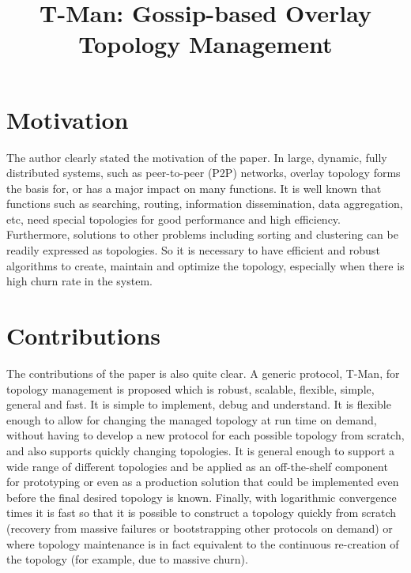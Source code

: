 \documentclass[conference]{IEEEtran}
\begin{document}
\title{T-Man: Gossip-based Overlay Topology Management}


\author{
\and
{}
}
\maketitle
\IEEEpeerreviewmaketitle



\section{Motivation}

The author clearly stated the motivation of the paper. In large, dynamic, fully distributed systems, such as peer-to-peer (P2P) networks, overlay topology forms the basis for, or has a major impact on many functions. It is well known that functions such as searching, routing, information dissemination, data aggregation, etc, need special topologies for good performance and high efficiency. Furthermore, solutions to other problems including sorting and clustering can be readily expressed as topologies. So it is necessary to have efficient and robust algorithms to create, maintain and optimize the topology, especially when there is high churn rate in the system.

\section{Contributions}

The contributions of the paper is also quite clear. A generic protocol, T-Man, for topology management is proposed which is robust, scalable, flexible, simple, general and fast. It is simple to implement, debug and understand. It is flexible enough to allow for changing the managed topology at run time on demand, without having to develop a new protocol for each possible topology from scratch, and also supports quickly changing topologies. It is general enough to support a wide range of different topologies and be applied as an off-the-shelf component for prototyping or even as a production solution that could be implemented even before the final desired topology is known. Finally, with logarithmic convergence times it is fast so that it is possible to construct a topology quickly from scratch (recovery from massive failures or bootstrapping other protocols on demand) or where topology maintenance is in fact equivalent to the continuous re-creation of the topology (for example, due to massive churn).
\end{document}
